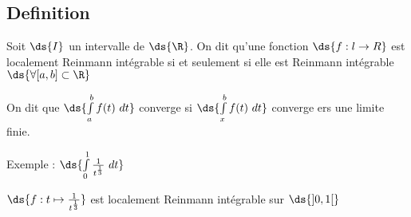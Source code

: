 \documentclass[11pt]{book}
\begin{document}
	\subsection{Definition}

	Soit $\ds{ I}$ un intervalle de $\ds{\R}$. On dit qu'une fonction $\ds{f:l\to R}$ est localement Reinmann intégrable si et seulement si elle est Reinmann intégrable $\ds{\forall [a,b]\subset \R }$

	On dit que $\ds{\int\limits_{a}^{b} f(t) \  d t }$ converge si $\ds{\int\limits_{x}^{b} f(t) \  d t }$ converge ers une limite finie.
	

	\begin{dent}{Exemple :}
		$\ds{\int\limits_{0}^{1} \frac{1}{t^{\frac{1}{3}}} \  d t }$ 

		$\ds{f:t\mapsto \frac{1}{t^{\frac{1}{3}}}}$ est localement Reinmann intégrable sur $\ds{]0,1[}$\\
	\end{dent}
	
\end{document}
